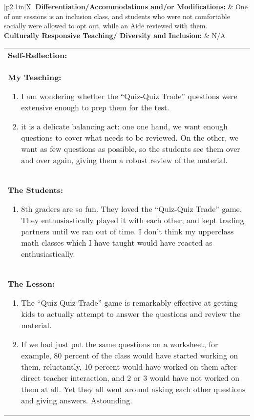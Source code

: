 \vskip 6pt

\begin{small}
  \begin{tabularx}{\linewidth}{|p{2.1in}|X|}
    \hline
    \textbf{Differentiation/Accommodations and/or Modifications: } & One of our sessions is an inclusion class, and students who were not comfortable socially were allowed to opt out, while an Aide reviewed with them.\\
    \hline
    \textbf{Culturally Responsive Teaching/ Diversity and Inclusion: } & N/A \\
    \hline
  \end{tabularx}
  
\vskip 6pt

\begin{tabularx}{\linewidth}{|X|}
  \hline
  \textbf{Self-Reflection:} \\
  \textbf{My Teaching:} 
  {\begin{enumerate}
  \item I am wondering whether the ``Quiz-Quiz Trade'' questions were extensive enough to prep them for the test.
  \item it is a delicate balancing act: one one hand, we want enough questions to cover what needs to be reviewed.  On the other, we want as few questions as possible, so the students see them over and over again, giving them a robust review of the material.
  \end{enumerate}} \\
  
  \textbf{The Students:}
  {\begin{enumerate}
  \item 8th graders are so fun.  They loved the ``Quiz-Quiz Trade''
    game.  They enthusiastically played it with each other, and kept
    trading partners until we ran out of time. I don't think my
    upperclass math classes which I have taught would have reacted as
    enthusiastically.
  \end{enumerate} }\\
  
  \textbf{The Lesson:}
  {\begin{enumerate}

    \item The ``Quiz-Quiz Trade'' game is remarkably effective at
      getting kids to actually attempt to answer the questions and
      review the material.
      
    \item If we had just put the same questions on a worksheet, for
      example, 80 percent of the class would have started working on
      them, reluctantly, 10 percent would have worked on them after
      direct teacher interaction, and 2 or 3 would have not worked on
      them at all.  Yet they all went around asking each other
      questions and giving answers.  Astounding.


\end{enumerate}}
\end{tabularx}
\end{small}
